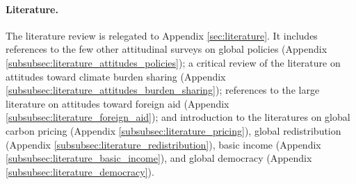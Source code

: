 \paragraph{Literature.} The literature review is relegated to Appendix \ref{sec:literature}. It includes references to the few other attitudinal surveys on global policies (Appendix \ref{subsubsec:literature_attitudes_policies}); a critical review of the literature on attitudes toward climate burden sharing (Appendix \ref{subsubsec:literature_attitudes_burden_sharing}); references to the large literature on attitudes toward foreign aid (Appendix \ref{subsubsec:literature_foreign_aid}); and introduction to the literatures on global carbon pricing (Appendix \ref{subsubsec:literature_pricing}), global redistribution (Appendix \ref{subsubsec:literature_redistribution}), basic income (Appendix \ref{subsubsec:literature_basic_income}), and global democracy (Appendix \ref{subsubsec:literature_democracy}). 


